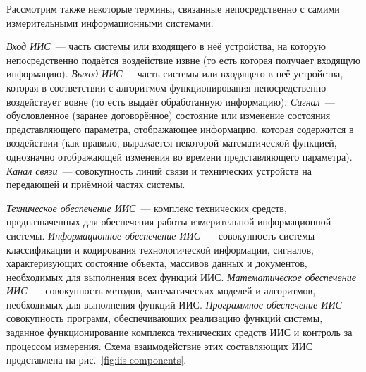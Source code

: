 \documentclass[a4paper, 14pt, titlepage]{extarticle}
\newcommand{\term}[1]{\emph{#1}}
\begin{document}
  Рассмотрим также некоторые термины, связанные непосредственно с самими измерительными информационными
  системами.

  \term{Вход ИИС}~--- часть системы или входящего в неё устройства, на которую непосредственно
  подаётся воздействие извне (то есть которая получает входящую информацию).
  \term{Выход ИИС}~---часть системы или входящего в неё устройства, которая в соответствии с
  алгоритмом функционирования непосредственно воздействует вовне (то есть выдаёт обработанную информацию).
  \term{Сигнал}~--- обусловленное (заранее договорённое) состояние или изменение состояния
  представляющего параметра, отображающее информацию, которая содержится в воздействии (как правило,
  выражается некоторой математической функцией, однозначно отображающей изменения во времени
  представляющего параметра).
  \term{Канал связи}~--- совокупность линий связи и технических устройств на передающей и приёмной
  частях системы.

  \term{Техническое обеспечение ИИС}~--- комплекс технических средств, предназначенных для
  обеспечения работы измерительной информационной системы.
  \term{Информационное обеспечение ИИС}~--- совокупность системы классификации и кодирования
  технологической информации, сигналов, характеризующих состояние объекта,
  массивов данных и документов, необходимых для выполнения всех функций ИИС.
  \term{Математическое обеспечение ИИС}~--- совокупность методов, математических моделей и алгоритмов,
  необходимых для выполнения функций ИИС.
  \term{Программное обеспечение ИИС}~--- совокупность программ, обеспечивающих реализацию функций
  системы, заданное функционирование комплекса технических средств ИИС и контроль за процессом измерения.
  Схема взаимодействие этих составляющих ИИС представлена на рис.~\ref{fig:iis-components}.
\end{document}
